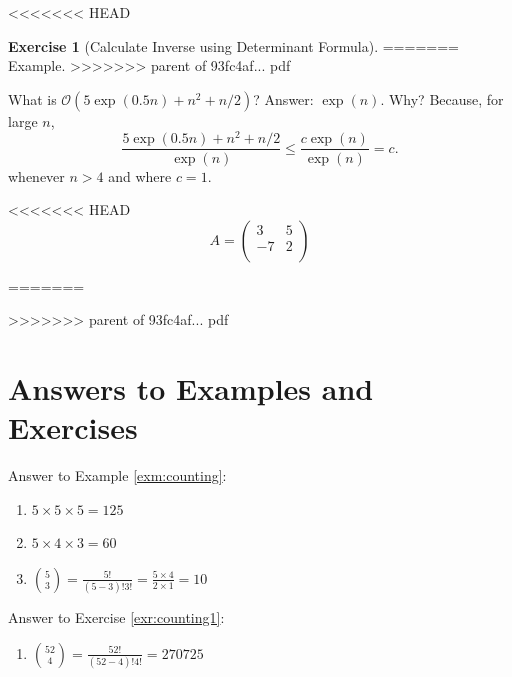 \documentclass[]{book}
\providecommand{\tightlist}{%
  \setlength{\itemsep}{0pt}\setlength{\parskip}{0pt}}
\theoremstyle{definition}
\theoremstyle{definition}
\theoremstyle{definition}
\newtheorem{exercise}{Exercise}[chapter]
\theoremstyle{remark}
\begin{document}
<<<<<<< HEAD
\begin{exercise}[Calculate Inverse using Determinant Formula]
\protect\hypertarget{exr:calcinverse}{}{\label{exr:calcinverse} {} }
=======
Example.
>>>>>>> parent of 93fc4af... pdf

What is \(\mathcal{O}( 5\exp(0.5 n) + n^2 + n / 2)\)? Answer: \(\exp(n)\). Why? Because, for large \(n\),
\[
\frac{ 5\exp(0.5 n) + n^2 + n / 2 }{ \exp(n)} \leq \frac{ c \exp(n) }{ \exp(n)} = c. 
\]
whenever \(n > 4\) and where \(c = 1\).

<<<<<<< HEAD
\[A = \begin{pmatrix}
            3 & 5\\
            -7 & 2\\
        \end{pmatrix}\]
\end{exercise}
=======

>>>>>>> parent of 93fc4af... pdf

\hypertarget{answers-to-examples-and-exercises-3}{%
\section*{Answers to Examples and Exercises}\label{answers-to-examples-and-exercises-3}}

Answer to Example \ref{exm:counting}:

\begin{enumerate}
\def\labelenumi{\arabic{enumi}.}
\item
  \(5 \times 5 \times 5 = 125\)
\item
  \(5 \times 4 \times 3 = 60\)
\item
  \(\binom{5}{3} = \frac{5!}{(5-3)!3!} = \frac{5 \times 4}{2 \times 1} = 10\)
\end{enumerate}

Answer to Exercise \ref{exr:counting1}:

\begin{enumerate}
\def\labelenumi{\arabic{enumi}.}
\tightlist
\item
  \(\binom{52}{4} = \frac{52!}{(52-4)!4!} = 270725\)
\end{enumerate}
\end{document}

